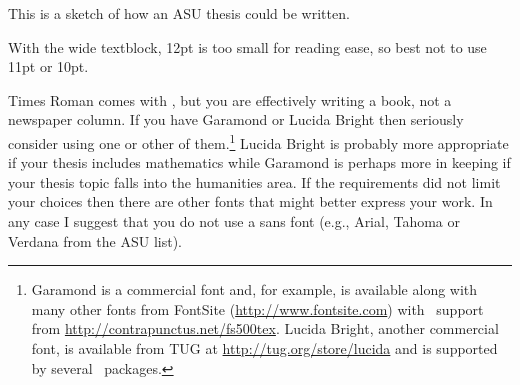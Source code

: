     This is a sketch of how an ASU thesis could be written. 

  With the wide textblock, 12pt is too small for reading ease, so best not
to use 11pt or 10pt.

    Times Roman comes with \ltx, but you are 
effectively writing a book, 
not a newspaper column. If you have Garamond 
or Lucida Bright then 
seriously consider using one or other of them.\footnote{Garamond is a 
commercial font and, for example, is available along with many other fonts 
from FontSite (\url{http://www.fontsite.com})
with \ltx\ support from \url{http://contrapunctus.net/fs500tex}.
Lucida Bright, another commercial font,
is available from TUG at \url{http://tug.org/store/lucida} and is supported
by several \ltx\ packages.} Lucida Bright is probably more appropriate if
your thesis includes mathematics while Garamond is perhaps more in keeping
if your thesis topic falls into the humanities area.
If the requirements did not limit your choices then there are other
fonts that might better express your work. In any case
I suggest that you do not use a sans font (e.g.,
Arial,
Tahoma or
Verdana from the ASU list).



